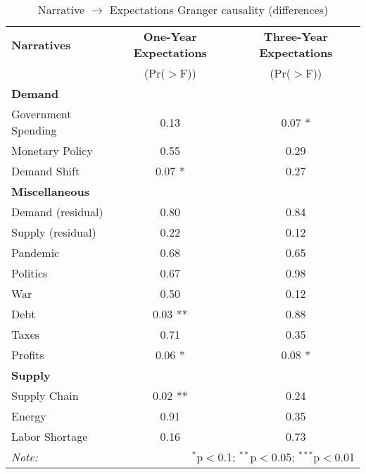 \begin{table}[ht]
\centering
\caption{Narrative $\rightarrow$ Expectations Granger causality (differences)}\label{tab:granger}

\begin{tabular}{lcc}
\toprule
\textbf{Narratives} & \textbf{One-Year Expectations} & \textbf{Three-Year Expectations} \\
& (Pr($>$F)) & (Pr($>$F)) \\
\midrule
\multicolumn{3}{l}{\textbf{Demand}} \\
\midrule
Government Spending & 0.13 & 0.07 * \\
Monetary Policy & 0.55 & 0.29 \\
Demand Shift & 0.07 * & 0.27 \\
\midrule
\multicolumn{3}{l}{\textbf{Miscellaneous}} \\
\midrule
Demand (residual) & 0.80 & 0.84 \\
Supply (residual) & 0.22 & 0.12 \\
Pandemic & 0.68 & 0.65 \\
Politics & 0.67 & 0.98 \\
War & 0.50 & 0.12 \\
Debt & 0.03 ** & 0.88 \\
Taxes & 0.71 & 0.35 \\
Profits & 0.06 * & 0.08 * \\
\midrule
\multicolumn{3}{l}{\textbf{Supply}} \\
\midrule
Supply Chain & 0.02 ** & 0.24 \\
Energy & 0.91 & 0.35 \\
Labor Shortage & 0.16 & 0.73 \\
\midrule
\bottomrule
\textit{Note:}  & \multicolumn{2}{r}{$^{*}$p$<$0.1; $^{**}$p$<$0.05; $^{***}$p$<$0.01} \\
\bottomrule
\end{tabular}
\end{table}
